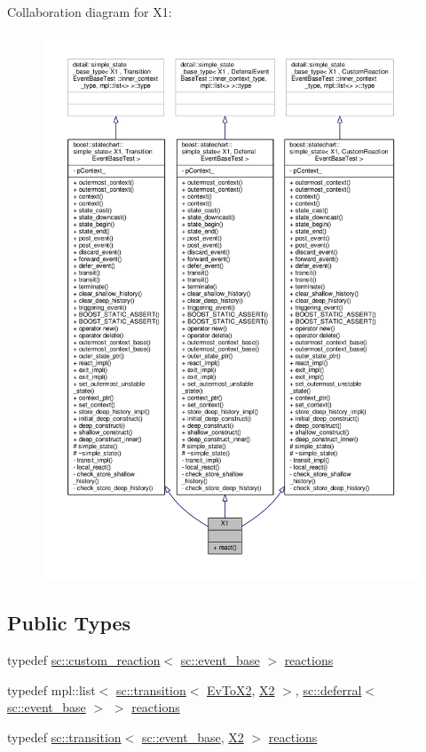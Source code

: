 Collaboration diagram for X1\+:
\nopagebreak
\begin{figure}[H]
\begin{center}
\leavevmode
\includegraphics[width=350pt]{struct_x1__coll__graph}
\end{center}
\end{figure}
\subsection*{Public Types}
\begin{DoxyCompactItemize}
\item 
typedef \mbox{\hyperlink{classboost_1_1statechart_1_1custom__reaction}{sc\+::custom\+\_\+reaction}}$<$ \mbox{\hyperlink{classboost_1_1statechart_1_1event__base}{sc\+::event\+\_\+base}} $>$ \mbox{\hyperlink{struct_x1_ab14c7f72d0b9d16885940a5e36752fa6}{reactions}}
\item 
typedef mpl\+::list$<$ \mbox{\hyperlink{classboost_1_1statechart_1_1transition}{sc\+::transition}}$<$ \mbox{\hyperlink{struct_ev_to_x2}{Ev\+To\+X2}}, \mbox{\hyperlink{struct_x2}{X2}} $>$, \mbox{\hyperlink{classboost_1_1statechart_1_1deferral}{sc\+::deferral}}$<$ \mbox{\hyperlink{classboost_1_1statechart_1_1event__base}{sc\+::event\+\_\+base}} $>$ $>$ \mbox{\hyperlink{struct_x1_aedd9c3baf74e22a2cce853b8d6e7cd02}{reactions}}
\item 
typedef \mbox{\hyperlink{classboost_1_1statechart_1_1transition}{sc\+::transition}}$<$ \mbox{\hyperlink{classboost_1_1statechart_1_1event__base}{sc\+::event\+\_\+base}}, \mbox{\hyperlink{struct_x2}{X2}} $>$ \mbox{\hyperlink{struct_x1_acc9fac15f3125efb8a45a3441feb1edc}{reactions}}
\end{DoxyCompactItemize}
